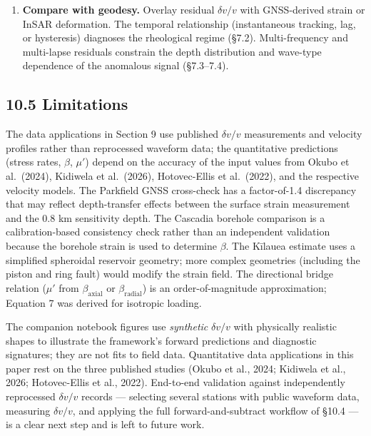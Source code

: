 \documentclass[draft]{agujournal2019}
\begin{document}
\begin{enumerate}
  \textbf{Subtract and interpret residuals.} Remove the modeled
  environmental contributions from the observed \(\delta v/v\) time
  series. Residuals may contain tectonic, volcanic, or anthropogenic
  signals. A robust residual should persist across the top-ranked window
  ensemble.
\item
  \textbf{Compare with geodesy.} Overlay residual \(\delta v/v\) with
  GNSS-derived strain or InSAR deformation. The temporal relationship
  (instantaneous tracking, lag, or hysteresis) diagnoses the rheological
  regime (§7.2). Multi-frequency and multi-lapse residuals constrain the
  depth distribution and wave-type dependence of the anomalous signal
  (§7.3--7.4).
\end{enumerate}

\subsection{10.5 Limitations}\label{limitations}

The data applications in Section 9 use published \(\delta v/v\)
measurements and velocity profiles rather than reprocessed waveform
data; the quantitative predictions (stress rates, \(\beta\), \(\mu'\))
depend on the accuracy of the input values from Okubo et al.~(2024),
Kidiwela et al.~(2026), Hotovec-Ellis et al.~(2022), and the respective
velocity models. The Parkfield GNSS cross-check has a factor-of-1.4
discrepancy that may reflect depth-transfer effects between the surface
strain measurement and the 0.8 km sensitivity depth. The Cascadia
borehole comparison is a calibration-based consistency check rather than
an independent validation because the borehole strain is used to
determine \(\beta\). The Kīlauea estimate uses a simplified spheroidal
reservoir geometry; more complex geometries (including the piston and
ring fault) would modify the strain field. The directional bridge
relation (\(\mu'\) from \(\beta_{\text{axial}}\) or
\(\beta_{\text{radial}}\)) is an order-of-magnitude approximation;
Equation 7 was derived for isotropic loading.

The companion notebook figures use \emph{synthetic} \(\delta v/v\) with
physically realistic shapes to illustrate the framework's forward
predictions and diagnostic signatures; they are not fits to field data.
Quantitative data applications in this paper rest on the three published
studies (Okubo et al., 2024; Kidiwela et al., 2026; Hotovec-Ellis et
al., 2022). End-to-end validation against independently reprocessed
\(\delta v/v\) records --- selecting several stations with public
waveform data, measuring \(\delta v/v\), and applying the full
forward-and-subtract workflow of §10.4 --- is a clear next step and is
left to future work.
\end{document}

